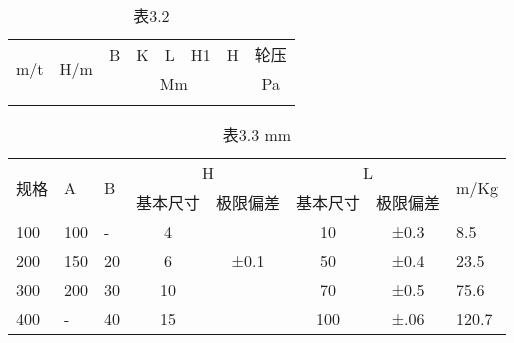 \begin{table}[htbp]
  \centering
  \caption{表3.2}
  \begin{tabular}{cccccccc}
    \toprule
    \multicolumn{1}{c}{\multirow{2}[4]{*}{m/t}} & \multicolumn{1}{c}{\multirow{2}[4]{*}{H/m}} & \multicolumn{1}{p{4.0em}}{B}    & \multicolumn{1}{p{4.0em}}{K}  & \multicolumn{1}{p{4.0em}}{L} & \multicolumn{1}{p{4.0em}}{H1} & \multicolumn{1}{p{4.0em}}{H} & \multicolumn{1}{p{4.0em}}{轮压} \\
    \cmidrule{3-8}                              &                                             & \multicolumn{5}{p{20.95em}}{Mm} & \multicolumn{1}{p{4.0em}}{Pa}                                                                                                                                 \\
    \midrule
                                                &                                             & \multicolumn{5}{c}{}            &                                                                                                                                                               \\
    \bottomrule
  \end{tabular}%
  \label{tab:tbl-1-2}%
\end{table}%

\begin{table}[htbp]
  \centering
  \caption{表3.3 mm}
  \begin{tabular}{p{2.6em}p{2.6em}p{2.6em}ccccp{3.2em}}
    \toprule
    \multirow{2}[4]{*}{规格} & \multirow{2}[4]{*}{A} & \multirow{2}[4]{*}{B} & \multicolumn{2}{c}{H} & \multicolumn{2}{c}{L} & \multirow{2}[4]{*}{m/Kg}                    \\
    \cmidrule{4-7}           &                       &                       & 基本尺寸              & 极限偏差              & 基本尺寸                 & 极限偏差 &       \\
    \midrule
    100                      & 100                   & -                     & 4                     &                       & 10                       & ±0.3     & 8.5   \\
    200                      & 150                   & 20                    & 6                     & ±0.1                  & 50                       & ±0.4     & 23.5  \\
    300                      & 200                   & 30                    & 10                    &                       & 70                       & ±0.5     & 75.6  \\
    400                      & -                     & 40                    & 15                    &                       & 100                      & ±.06     & 120.7 \\
    \bottomrule
  \end{tabular}%
  \label{tab:tbl-1-3}%
\end{table}%

